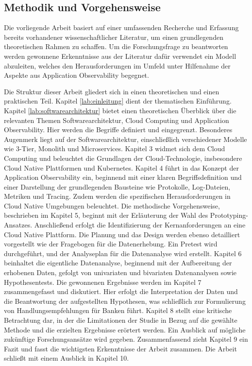 \subsection{Methodik und Vorgehensweise}\label{lab:methodik}

Die vorliegende Arbeit basiert auf einer umfassenden Recherche und Erfassung bereits vorhandener wissenschaftlicher Literatur, um einen grundlegenden theoretischen Rahmen zu schaffen. Um die Forschungsfrage zu beantworten werden gewonnene Erkenntnisse aus der Literatur dafür verwendet ein Modell abzuleiten, welches den Herausforderungen im \cn Umfeld unter Hilfenahme der Aspekte aus Application Observability begegnet.


Die Struktur dieser Arbeit gliedert sich in einen theoretischen und einen praktischen Teil. Kapitel \ref{lab:einleitung} dient der thematischen Einführung. Kapitel \ref{lab:softwarearchitektur} bietet einen theoretischen Überblick über die relevanten Themen Softwarearchitektur, Cloud Computing und Application Observability. Hier werden die Begriffe definiert und eingegrenzt. Besonderes Augenmerk liegt auf der Softwarearchitektur, einschließlich verschiedener Modelle wie 3-Tier, Monolith und Microservices. Kapitel 3 widmet sich dem Cloud Computing und beleuchtet die Grundlagen der Cloud-Technologie, insbesondere Cloud Native Plattformen und Kubernetes.
Kapitel 4 führt in das Konzept der Application Observability ein, beginnend mit einer klaren Begriffsdefinition und einer Darstellung der grundlegenden Bausteine wie Protokolle, Log-Dateien, Metriken und Tracing. Zudem werden die spezifischen Herausforderungen in Cloud Native Umgebungen beleuchtet.
Die methodische Vorgehensweise, beschrieben im Kapitel 5, beginnt mit der Erläuterung der Wahl des Prototyping-Ansatzes. Anschließend erfolgt die Identifizierung der Kernanforderungen an eine Cloud Native Plattform. Die Planung und das Design werden ebenso detailliert vorgestellt wie der Fragebogen für die Datenerhebung. Ein Pretest wird durchgeführt, und der Analyseplan für die Datenanalyse wird erstellt.
Kapitel 6 beinhaltet die eigentliche Datenanalyse, beginnend mit der Aufbereitung der erhobenen Daten, gefolgt von univariaten und bivariaten Datenanalysen sowie Hypothesentests. Die gewonnenen Ergebnisse werden im Kapitel 7 zusammengefasst und diskutiert. Hier erfolgt die Interpretation der Daten und die Beantwortung der aufgestellten Hypothesen, was schließlich zur Formulierung von Handlungsempfehlungen für Banken führt.
Kapitel 8 stellt eine kritische Betrachtung dar, in der die Limitationen der Studie in Bezug auf die gewählte Methode und die erzielten Ergebnisse erörtert werden. Ein Ausblick auf mögliche zukünftige Forschungsansätze wird gegeben.
Zusammenfassend zieht Kapitel 9 ein Fazit und fasst die wichtigsten Erkenntnisse der Arbeit zusammen. Die Arbeit schließt mit einem Ausblick in Kapitel 10.

